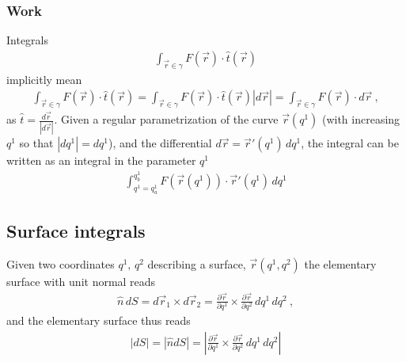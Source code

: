 \documentclass[letterpaper,10pt,english]{jupyterBook}
\begin{document}
\subsubsection{Work}
\label{\detokenize{ch/tensor-algebra-calculus/calculus-euclidean:work}}\label{\detokenize{ch/tensor-algebra-calculus/calculus-euclidean:tensor-calculus-integrals-line-work}}
\sphinxAtStartPar
Integrals
\begin{equation*}
\begin{split}\int_{\vec{r} \in \gamma} F(\vec{r}) \cdot \hat{t}(\vec{r})\end{split}
\end{equation*}
\sphinxAtStartPar
implicitly mean
\begin{equation*}
\begin{split}\int_{\vec{r} \in \gamma} F(\vec{r}) \cdot \hat{t}(\vec{r}) = \int_{\vec{r} \in \gamma} F(\vec{r}) \cdot \hat{t}(\vec{r}) |d \vec{r}| = \int_{\vec{r} \in \gamma} F(\vec{r}) \cdot d \vec{r} \ ,\end{split}
\end{equation*}
\sphinxAtStartPar
as \(\hat{t} = \frac{d \vec{r}}{|d \vec{r}|}\).
Given a regular parametrization of the curve \(\vec{r}(q^1)\) (with increasing \(q^1\) so that \(|dq^1| = dq^1\)), and the differential \(d \vec{r} = \vec{r}'(q^1) \, d q^1\), the integral can be written as an integral in the parameter \(q^1\)
\begin{equation*}
\begin{split}\int_{q^1=q^1_a}^{q^1_b} F(\vec{r}(q^1)) \cdot \vec{r}'(q^1) \, dq^1\end{split}
\end{equation*}

\subsection{Surface integrals}
\label{\detokenize{ch/tensor-algebra-calculus/calculus-euclidean:surface-integrals}}\label{\detokenize{ch/tensor-algebra-calculus/calculus-euclidean:tensor-calculus-integrals-surface}}
\sphinxAtStartPar
Given two coordinates \(q^1, \, q^2\) describing a surface, \(\vec{r}(q^1, q^2)\) the elementary surface with unit normal reads
\begin{equation*}
\begin{split}\hat{n} \, dS = d \vec{r}_1 \times d \vec{r}_2 = \frac{\partial \vec{r}}{\partial q^1} \times \frac{\partial \vec{r}}{\partial q^2} \, dq^1 \, dq^2 \ ,\end{split}
\end{equation*}
\sphinxAtStartPar
and the elementary surface thus reads
\begin{equation*}
\begin{split}|dS| = |\hat{n} dS| = \left| \frac{\partial \vec{r}}{\partial q^1} \times \frac{\partial \vec{r}}{\partial q^2} \, dq^1 \, dq^2  \right|\end{split}
\end{equation*}
\end{document}
